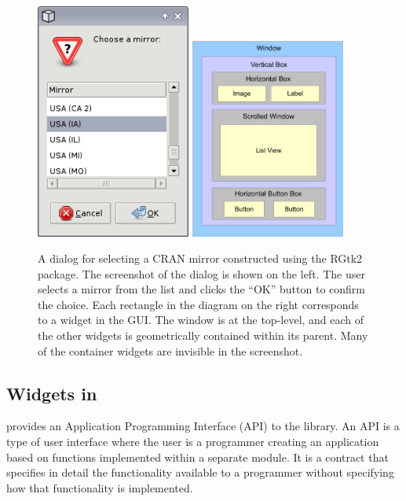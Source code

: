 \documentclass[article]{jss}
\begin{document}
\begin{figure}[bhp]
\begin{center}
\includegraphics[width=2in]{cran-mirror.png}
\includegraphics[width=2in]{widget-hierarchy.pdf}
\caption{\label{fig:cran-mirror}\label{fig:widget-hierarchy} 
A dialog for selecting a CRAN mirror constructed
using the RGtk2 package. The screenshot of the dialog is shown on the
left. The user selects a mirror from the list and clicks the
``OK'' button to confirm the choice.
Each rectangle in the diagram on the right corresponds to a widget in
the GUI. The window is at the top-level,
and each of the other widgets is geometrically contained within its
parent. Many of the container widgets are invisible in the
screenshot.}
\end{center}
\end{figure}

\subsection[GTK+ Widgets in R]{ Widgets in }

 provides an Application Programming Interface (API) to the
library. An API is a type of user interface where the user
is a programmer creating an application based on functions implemented
within a separate module. It is a contract that specifies in detail
the functionality available to a programmer without specifying how
that functionality is implemented. 
 
\end{document}
